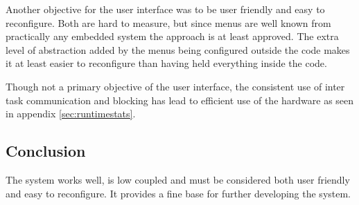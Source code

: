Another objective for the user interface was to be user friendly and easy to reconfigure. Both are hard to measure, but since menus are well known from practically any embedded system the approach is at least approved. The extra level of abstraction added by the menus being configured outside the code makes it at least easier to reconfigure than having held everything inside the code.

Though not a primary objective of the user interface, the consistent use of inter task communication and blocking has lead to efficient use of the hardware as seen in appendix \ref{sec:runtimestats}.
\subsection{Conclusion}
The system works well, is low coupled and must be considered both user friendly and easy to reconfigure. It provides a fine base for further developing the system.
